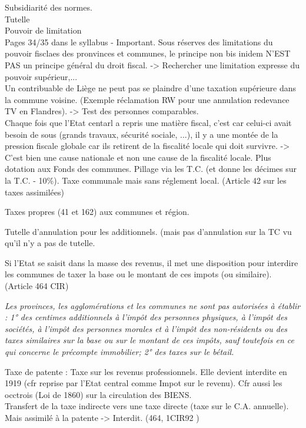 \documentclass{book}
\begin{document}
Subsidiarité des normes.\\
Tutelle\\
Pouvoir de limitation\\

Pages 34/35 dans le syllabus - Important. Sous réserves des limitations du pouvoir fisclaes des pronvinces et communes, le principe non bis inidem N'EST PAS un principe général du droit fiscal. -> Rechercher une limitation expresse du pouvoir supérieur,...\\

Un contribuable de Liège ne peut pas se plaindre d'une taxation supérieure dans la commune voisine. (Exemple réclamation RW pour une annulation redevance TV en Flandres). -> Test des personnes comparables.\\

Chaque fois que l'Etat centarl a repris une matière fiscal, c'est car celui-ci avait besoin de sous (grands travaux, sécurité sociale, ...), il y a une montée de la pression fiscale globale car ils retirent de la fiscalité locale qui doit survivre. -> C'est bien une cause nationale et non une cause de la fiscalité locale. Plus dotation aux Fonds des communes.	Pillage via les T.C. (et donne les décimes sur la T.C. - 10\%). Taxe communale mais sans réglement local. (Article 42 sur les taxes assimilées)

Taxes propres (41 et 162) aux communes et région.

Tutelle d'annulation pour les additionnels. (mais pas d'annulation sur la TC vu qu'il n'y a pas de tutelle.

Si l'Etat se saisit dans la masse des revenus, il met une disposition pour interdire les communes de taxer la base ou le montant de ces impots (ou similaire). (Article 464 CIR)

\textit{Les provinces, les agglomérations et les communes ne sont pas autorisées à établir :
1° des centimes additionnels à l'impôt des personnes physiques, à l'impôt des sociétés, à l'impôt des
personnes morales et à l'impôt des non-résidents ou des taxes similaires sur la base ou sur le montant
de ces impôts, sauf toutefois en ce qui concerne le précompte immobilier;
2° des taxes sur le bétail.}

Taxe de patente : Taxe sur les revenus professionnels. Elle devient interdite en 1919 (cfr reprise par l'Etat central comme Impot sur le revenu). Cfr aussi les occtrois (Loi de 1860) sur la circulation des BIENS.\\

Transfert de la taxe indirecte vers une taxe directe (taxe sur le C.A. annuelle). Mais assimilé à la patente -> Interdit. (464, 1\degre CIR92 )
\end{document}
